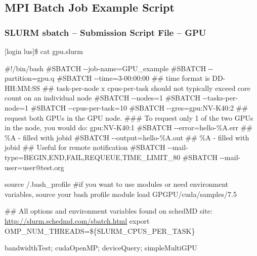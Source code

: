 \documentclass[t,hyperref={pdfpagelabels=false}]{beamer}
\newcommand{\ctilde}{{\fontfamily{ptm}\selectfont\texttildelow}}
\newcommand{\ddash}{-{}-}
\begin{document}
\subsection{MPI Batch Job Example Script}
\begin{frame}[fragile]
\frametitle{SLURM sbatch -- Submission Script File -- GPU}
\begin{semiverbatim}\tiny
[login lus]\$ cat gpu.slurm

\#!/bin/bash
\#SBATCH \ddash{}job-name=GPU\_example
\#SBATCH \ddash{}partition=gpu.q
\#SBATCH \ddash{}time=3-00:00:00 ## time format is DD-HH:MM:SS
\#\# task-per-node x cpus-per-task should not typically exceed core count on an individual node 
\#SBATCH \ddash{}nodes=1
\#SBATCH \ddash{}tasks-per-node=1
\#SBATCH \ddash{}cpus-per-task=10
\#SBATCH \ddash{}gres=gpu:NV-K40:2  \#\# request both GPUs in the GPU node.
\#\#\# To request only 1 of the two GPUs in the node, you would do: gpu:NV-K40:1
\#SBATCH \ddash{}error=hello-\%A.err \#\# \%A - filled with jobid
\#SBATCH \ddash{}output=hello-\%A.out \#\# \%A - filled with jobid
\#\# Useful for remote notification
\#SBATCH \ddash{}mail-type=BEGIN,END,FAIL,REQUEUE,TIME\_LIMIT\_80
\#SBATCH \ddash{}mail-user=user@test.org

source \ctilde/.bash_profile \#if you want to use modules or need environment variables, source your bash profile
module load GPGPU/cuda/samples/7.5

\#\# All options and environment variables found on schedMD site: \href{http://slurm.schedmd.com/sbatch.html}{http://slurm.schedmd.com/sbatch.html}
export OMP\_NUM\_THREADS=\$\{SLURM\_CPUS\_PER\_TASK\}

bandwidthTest; cudaOpenMP; deviceQuery; simpleMultiGPU
\end{semiverbatim}
\end{frame}
\end{document}
